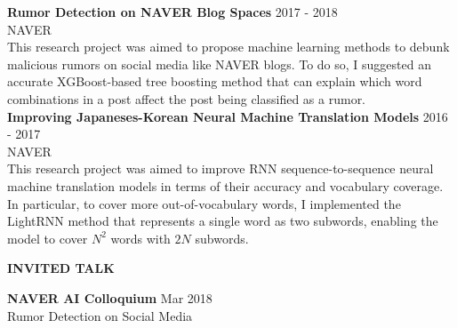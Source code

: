 \documentclass[12pt]{article}
\begin{document}
\noindent
{\bfseries Rumor Detection on NAVER Blog Spaces} \hfill 2017 - 2018 \\ 
\noindent 
NAVER\\
This research project was aimed to propose machine learning methods to debunk malicious rumors on social media like NAVER blogs. 
To do so, I suggested an accurate XGBoost-based tree boosting method that can explain which word combinations in a post affect the post being classified as a rumor.\\

\noindent
{\bfseries Improving Japaneses-Korean Neural Machine Translation Models} \hfill 2016 - 2017 \\ 
\noindent 
NAVER \\ 
This research project was aimed to improve RNN sequence-to-sequence neural machine translation models in terms of their accuracy and vocabulary coverage.
In particular, to cover more out-of-vocabulary words, I implemented the LightRNN method that represents a single word as two subwords, enabling the model to cover $N^2$ words with $2N$ subwords.
\vspace{0.2in} %


\begin{center}
	{\noindent \bfseries INVITED TALK}
    \noindent\makebox[\linewidth]{\rule{0.75\paperwidth}{0.4pt}}
\end{center}

\noindent
{\bfseries NAVER AI Colloquium} \hfill Mar 2018 \\ 
\noindent Rumor Detection on Social Media \\ 

\vspace{0.2in} %

\end{document}
